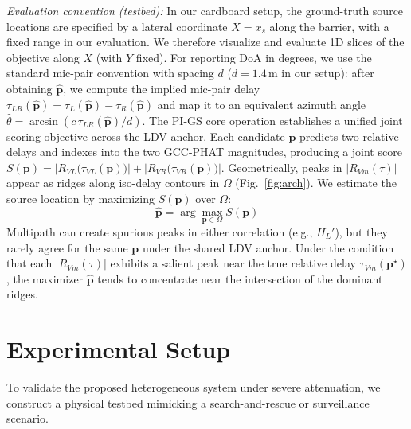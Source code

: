 \documentclass{Interspeech}
\begin{document}
\textit{Evaluation convention (testbed):} In our cardboard setup, the ground-truth source locations are specified by a lateral coordinate $X=x_s$ along the barrier, with a fixed range in our evaluation. We therefore visualize and evaluate 1D slices of the objective along $X$ (with $Y$ fixed). For reporting DoA in degrees, we use the standard mic-pair convention with spacing $d$ ($d=1.4$\,m in our setup): after obtaining $\hat{\mathbf{p}}$, we compute the implied mic-pair delay $\tau_{LR}(\hat{\mathbf{p}})=\tau_L(\hat{\mathbf{p}})-\tau_R(\hat{\mathbf{p}})$ and map it to an equivalent azimuth angle $\hat{\theta}=\arcsin(c\,\tau_{LR}(\hat{\mathbf{p}})/d)$. The PI-GS core operation establishes a unified joint scoring objective across the LDV anchor. Each candidate $\mathbf{p}$ predicts two relative delays and indexes into the two GCC-PHAT magnitudes, producing a joint score
$S(\mathbf{p}) = \left|R_{VL}\big(\tau_{VL}(\mathbf{p})\big)\right| + \left|R_{VR}\big(\tau_{VR}(\mathbf{p})\big)\right|$.
Geometrically, peaks in $|R_{Vm}(\tau)|$ appear as ridges along iso-delay contours in $\Omega$ (Fig.~\ref{fig:arch}). We estimate the source location by maximizing $S(\mathbf{p})$ over $\Omega$:
%
\begin{equation}
  \hat{\mathbf{p}} = \arg\max_{\mathbf{p} \in \Omega} S(\mathbf{p})
  \label{eq:obj}
\end{equation}
%
Multipath can create spurious peaks in either correlation (e.g., $H_L'$), but they rarely agree for the same $\mathbf{p}$ under the shared LDV anchor. Under the condition that each $|R_{Vm}(\tau)|$ exhibits a salient peak near the true relative delay $\tau_{Vm}(\mathbf{p}^\star)$, the maximizer $\hat{\mathbf{p}}$ tends to concentrate near the intersection of the dominant ridges.

\section{Experimental Setup}
\label{sec:experiments}

To validate the proposed heterogeneous system under severe attenuation, we construct a physical testbed mimicking a search-and-rescue or surveillance scenario.
\end{document}
